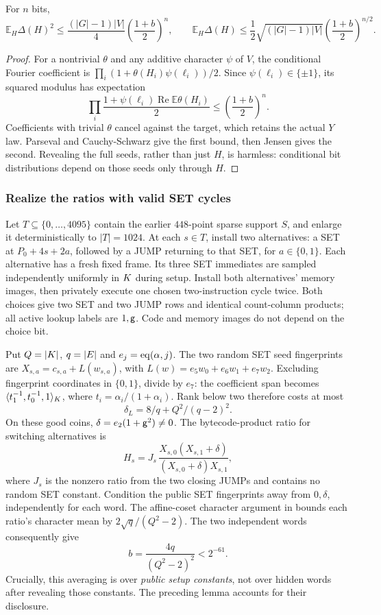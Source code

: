 \begin{lemma}
For $n$ bits,
\[
 \mathbb E_H\Delta(H)^2\le
 \frac{(|G|-1)|V|}{4}\left(\frac{1+b}{2}\right)^n,
 \qquad
 \mathbb E_H\Delta(H)\le
 \frac12\sqrt{(|G|-1)|V|}\left(\frac{1+b}{2}\right)^{n/2}.
\]
\end{lemma}
\begin{proof}
For a nontrivial $\theta$ and any additive character $\psi$ of $V$, the conditional Fourier coefficient is $\prod_i(1+\theta(H_i)\psi(\ell_i))/2$. Since $\psi(\ell_i)\in\{\pm1\}$, its squared modulus has expectation
\[
 \prod_i\frac{1+\psi(\ell_i)\operatorname{Re}\mathbb E\theta(H_i)}2
 \le\left(\frac{1+b}{2}\right)^n.
\]
Coefficients with trivial $\theta$ cancel against the target, which retains the actual $Y$ law. Parseval and Cauchy-Schwarz give the first bound, then Jensen gives the second. Revealing the full seeds, rather than just $H$, is harmless: conditional bit distributions depend on those seeds only through $H$.
\end{proof}

\subsubsection{Realize the ratios with valid SET cycles}

Let $T\subseteq\{0,\ldots,4095\}$ contain the earlier $448$-point sparse support $S$, and enlarge it deterministically to $|T|=1024$. At each $s\in T$, install two alternatives: a SET at $P_0+4s+2a$, followed by a JUMP returning to that SET, for $a\in\{0,1\}$. Each alternative has a fresh fixed frame. Its three SET immediates are sampled independently uniformly in $K$ during setup. Install both alternatives' memory images, then privately execute one chosen two-instruction cycle twice. Both choices give two SET and two JUMP rows and identical count-column products; all active lookup labels are $1,\mathsf{g}$. Code and memory images do not depend on the choice bit.

Put $Q=|K|$, $q=|E|$ and $e_j=\operatorname{eq}(\alpha,j)$. The two random SET seed fingerprints are $X_{s,a}=c_{s,a}+L(w_{s,a})$, with $L(w)=e_5w_0+e_6w_1+e_7w_2$. Excluding fingerprint coordinates in $\{0,1\}$, divide by $e_7$: the coefficient span becomes $\langle t_1^{-1},t_0^{-1},1\rangle_{K}$, where $t_i=\alpha_i/(1+\alpha_i)$. Rank below two therefore costs at most
\[
 \delta_L=8/q+Q^2/(q-2)^2.
\]
On these good coins, $\delta=e_2(1+\mathsf{g}^2)\ne0$. The bytecode-product ratio for switching alternatives is
\[
 H_s=J_s\,
 \frac{X_{s,0}(X_{s,1}+\delta)}{(X_{s,0}+\delta)X_{s,1}},
\]
where $J_s$ is the nonzero ratio from the two closing JUMPs and contains no random SET constant. Condition the public SET fingerprints away from $0,\delta$, independently for each word. The affine-coset character argument in  bounds each ratio's character mean by $2\sqrt q/(Q^2-2)$. The two independent words consequently give
\[
 b=\frac{4q}{(Q^2-2)^2}<2^{-61}.
\]
Crucially, this averaging is over \emph{public setup constants}, not over hidden words after revealing those constants. The preceding lemma accounts for their disclosure.

